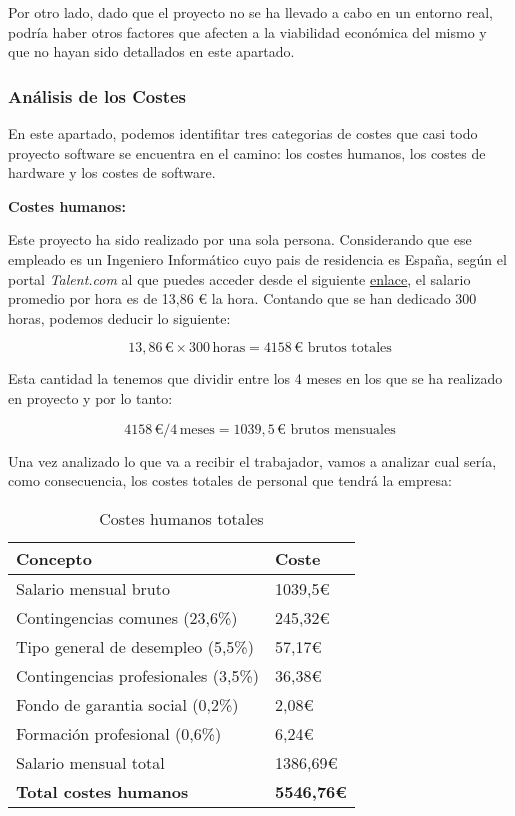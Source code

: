 Por otro lado, dado que el proyecto no se ha llevado a cabo  en un entorno real, podría haber otros factores que afecten a la viabilidad económica del mismo y que no hayan sido detallados en este apartado.

\subsubsection{Análisis de los Costes}

En este apartado, podemos identifitar tres categorias de costes que casi todo proyecto software se encuentra en el camino:  los costes humanos, los costes de hardware y los costes de software.

\textbf{Costes humanos:}

Este proyecto ha sido realizado por una sola persona. Considerando que ese empleado es un Ingeniero Informático cuyo pais de residencia es España, según el portal \textit{Talent.com} al que puedes acceder desde el siguiente \href{https://es.talent.com/salary?job=ingeniero+inform%C3%A1tico}{enlace}, el salario promedio por hora es de 13,86 € la hora. Contando que se han dedicado 300 horas, podemos deducir lo siguiente:

\[ 13,86 \, \text{€} \times 300 \, \text{horas} = 4158 \, \text{€ brutos totales} \]

Esta cantidad la tenemos que dividir entre los 4 meses en los que se ha realizado en proyecto y por lo tanto:

\[ 4158 \, \text{€} / 4 \, \text{meses} = 1039,5 \, \text{€ brutos mensuales} \]

Una vez analizado lo que va a recibir el trabajador, vamos a analizar cual sería, como consecuencia, los costes totales de personal que tendrá la empresa:


\begin{table}[H]
    \centering
    \renewcommand{\arraystretch}{1.2}
    \setlength{\tabcolsep}{20pt}
    \begin{tabular}{l l}
        \hline
        \textbf{Concepto} & \textbf{Coste} \\ \hline
        Salario mensual bruto & 1039,5€ \\
        Contingencias comunes (23,6\%) & 245,32€\\
        Tipo general de  desempleo (5,5\%) & 57,17€\\
        Contingencias profesionales (3,5\%) & 36,38€\\
        Fondo de garantia social (0,2\%)& 2,08€\\
        Formación profesional (0,6\%) & 6,24€\\
        Salario mensual total & 1386,69€\\  \hline
        \textbf{Total costes humanos} & \textbf{5546,76€}\\ \hline
    \end{tabular}
    \caption{Costes humanos totales}
    \label{tab:costes_humanos}
\end{table}

